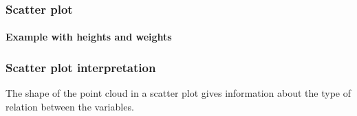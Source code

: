 \begin{frame}
\frametitle{Scatter plot}
\framesubtitle{Example with heights and weights}
\begin{center}
\resizebox{0.9\textwidth}{!}{}
\end{center}
\end{frame}


\begin{frame}
\frametitle{Scatter plot interpretation}
The shape of the point cloud in a scatter plot gives information about the type of relation between the variables.

\begin{center}
\end{center}
\end{frame}


